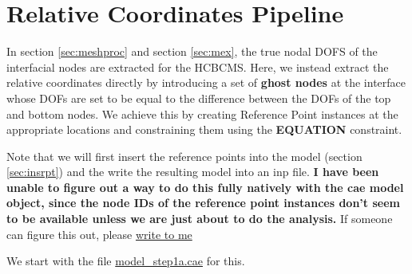\documentclass[11pt]{article}
\begin{document}
\section{Relative Coordinates Pipeline}
\label{sec:relcsp}
In section \ref{sec:meshproc} and section \ref{sec:mex}, the true nodal DOFS of the interfacial nodes are extracted for the HCBCMS.
Here, we instead extract the relative coordinates directly by introducing a set of \textbf{ghost nodes} at the interface whose DOFs are set to be equal to the difference between the DOFs of the top and bottom nodes.
We achieve this by creating Reference Point instances at the appropriate locations and constraining them using the \textbf{EQUATION} constraint.

Note that we will first insert the reference points into the model (section \ref{sec:insrpt}) and the write the resulting model into an inp file.
\textbf{I have been unable to figure out a way to do this fully natively with the cae model object, since the node IDs of the reference point instances don't seem to be available unless we are just about to do the analysis.}
If someone can figure this out, please \href{mailto:nidbid@gmail.com}{write to me}

We start with the file \href{https://github.com/Nidish96/Abaqus4Joints/blob/main/assets/assembly/model\_step1a.cae}{model\_step1a.cae} for this.
\end{document}
